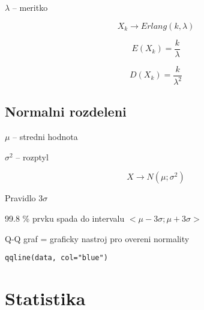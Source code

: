 \documentclass{article}
\begin{document}
$\lambda$ -- meritko

\[ X_k \rightarrow Erlang(k, \lambda) \]

\[ E(X_k) = \frac{k}{\lambda} \]

\[ D(X_k) = \frac{k}{\lambda^2} \]

\subsection{Normalni rozdeleni}

$\mu$ -- stredni hodnota

$\sigma^2$ -- rozptyl

\[ X \rightarrow N(\mu; \sigma^2) \]

Pravidlo 3$\sigma$

99.8 \% prvku spada do intervalu $<\mu - 3\sigma; \mu + 3\sigma>$

Q-Q graf = graficky nastroj pro overeni normality

\begin{verbatim}
qqline(data, col="blue")
\end{verbatim}

\section{Statistika}
\end{document}
